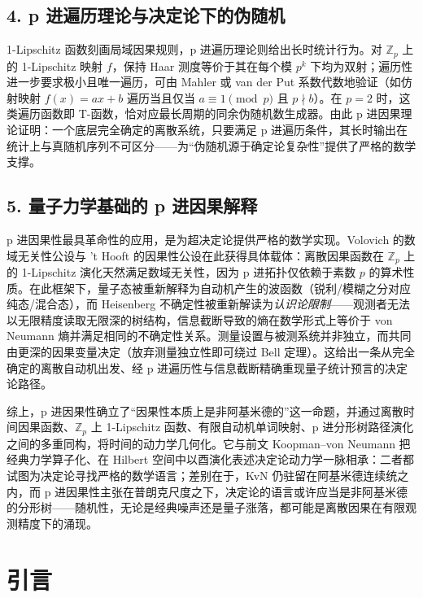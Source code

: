 ﻿\documentclass[10pt,a4paper]{article}
\numberwithin{equation}{section}
\begin{document}
\subsection*{4. p 进遍历理论与决定论下的伪随机}

1-Lipschitz 函数刻画局域因果规则，p 进遍历理论则给出长时统计行为。对 $\mathbb{Z}_{p}$ 上的 1-Lipschitz 映射 $f$，保持 Haar 测度等价于其在每个模 $p^{k}$ 下均为双射；遍历性进一步要求极小且唯一遍历，可由 Mahler 或 van der Put 系数代数地验证（如仿射映射 $f(x)=ax+b$ 遍历当且仅当 $a\equiv1\pmod p$ 且 $p\nmid b$）。在 $p=2$ 时，这类遍历函数即 T-函数，恰对应最长周期的同余伪随机数生成器。由此 p 进因果理论证明：一个底层完全确定的离散系统，只要满足 p 进遍历条件，其长时输出在统计上与真随机序列不可区分——为“伪随机源于确定论复杂性”提供了严格的数学支撑。

\subsection*{5. 量子力学基础的 p 进因果解释}

p 进因果性最具革命性的应用，是为超决定论提供严格的数学实现。Volovich 的数域无关性公设与 't Hooft 的因果性公设在此获得具体载体：离散因果函数在 $\mathbb{Z}_{p}$ 上的 1-Lipschitz 演化天然满足数域无关性，因为 p 进拓扑仅依赖于素数 $p$ 的算术性质。在此框架下，量子态被重新解释为自动机产生的波函数（锐利/模糊之分对应纯态/混合态），而 Heisenberg 不确定性被重新解读为\emph{认识论限制}——观测者无法以无限精度读取无限深的树结构，信息截断导致的熵在数学形式上等价于 von Neumann 熵并满足相同的不确定性关系。测量设置与被测系统并非独立，而共同由更深的因果变量决定（放弃测量独立性即可绕过 Bell 定理）。这给出一条从完全确定的离散自动机出发、经 p 进遍历性与信息截断精确重现量子统计预言的决定论路径。

综上，p 进因果性确立了“因果性本质上是非阿基米德的”这一命题，并通过离散时间因果函数、$\mathbb{Z}_{p}$ 上 1-Lipschitz 函数、有限自动机单词映射、p 进分形树路径演化之间的多重同构，将时间的动力学几何化。它与前文 Koopman--von Neumann 把经典力学算子化、在 Hilbert 空间中以酉演化表述决定论动力学一脉相承：二者都试图为决定论寻找严格的数学语言；差别在于，KvN 仍驻留在阿基米德连续统之内，而 p 进因果性主张在普朗克尺度之下，决定论的语言或许应当是非阿基米德的分形树——随机性，无论是经典噪声还是量子涨落，都可能是离散因果在有限观测精度下的涌现。

\section{引言}
\end{document}
